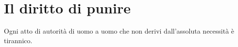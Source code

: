 \documentclass[preview]{standalone}
\begin{document}
\genpage

\section{Il diritto di punire}

\begin{plainhtml}
    Ogni atto di autorità di uomo a uomo che non derivi dall'assoluta necessità è tirannico.
\end{plainhtml}
\end{document}
